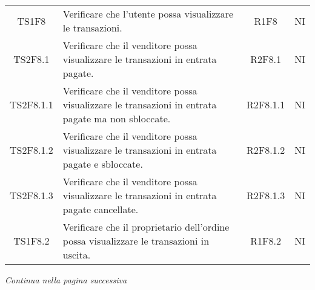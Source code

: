 \begin{table}[H]
\begin{tabular}{c|p{8cm}|c|c}
    TS1F8     & Verificare che l'utente possa visualizzare le transazioni.                                                                             & R1F8     & NI \\
    TS2F8.1   & Verificare che il venditore possa visualizzare le transazioni in entrata pagate.                                                       & R2F8.1   & NI \\
    TS2F8.1.1 & Verificare che il venditore possa visualizzare le transazioni in entrata pagate ma non sbloccate.                                      & R2F8.1.1 & NI \\
    TS2F8.1.2 & Verificare che il venditore possa visualizzare le transazioni in entrata pagate e sbloccate.                                           & R2F8.1.2 & NI \\
    TS2F8.1.3 & Verificare che il venditore possa visualizzare le transazioni in entrata pagate cancellate.                                            & R2F8.1.3 & NI \\
    TS1F8.2   & Verificare che il proprietario dell'ordine possa visualizzare le transazioni in uscita.                                                & R1F8.2   & NI \\
  \end{tabular}
\end{table}
\begin{center}
  \textit{\small Continua nella pagina successiva}
\end{center}
